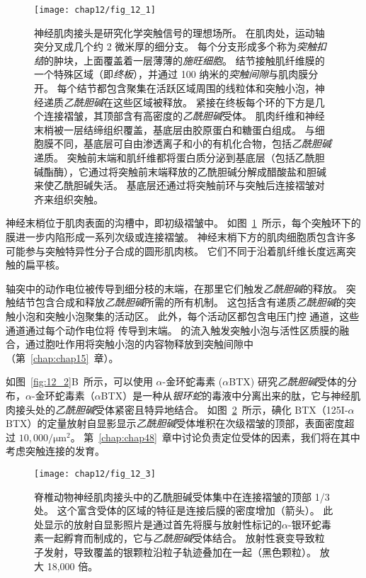 \begin{figure}[htbp]
	\centering
	\texttt{[image: chap12/fig\_12\_1]}
	\caption{神经肌肉接头是研究化学突触信号的理想场所。
		在肌肉处，运动轴突分叉成几个约 2 微米厚的细分支。
		每个分支形成多个称为\textit{突触扣结}的肿块，上面覆盖着一层薄薄的\textit{施旺细胞}。
		结节接触肌纤维膜的一个特殊区域（即\textit{终板}），并通过 100 纳米的\textit{突触间隙}与肌肉膜分开。
		每个结节都包含聚集在活跃区域周围的线粒体和突触小泡，神经递质\textit{乙酰胆碱}在这些区域被释放。
		紧接在终板每个环的下方是几个连接褶皱，其顶部含有高密度的\textit{乙酰胆碱}受体。
		肌肉纤维和神经末梢被一层结缔组织覆盖，基底层由胶原蛋白和糖蛋白组成。
		与细胞膜不同，基底层可自由渗透离子和小的有机化合物，包括\textit{乙酰胆碱}递质。
		突触前末端和肌纤维都将蛋白质分泌到基底层（包括乙酰胆碱酯酶），它通过将突触前末端释放的乙酰胆碱分解成醋酸盐和胆碱来使乙酰胆碱失活。
		基底层还通过将突触前环与突触后连接褶皱对齐来组织突触\cite{mcmahan1971visual}。}
	\label{fig:12_1}
\end{figure}


神经末梢位于肌肉表面的沟槽中，即初级褶皱中。
如图~\ref{fig:12_1}~所示，每个突触环下的膜进一步内陷形成一系列次级或连接褶皱。
神经末梢下方的肌肉细胞质包含许多可能参与突触特异性分子合成的圆形肌肉核。
它们不同于沿着肌纤维长度远离突触的扁平核。


轴突中的动作电位被传导到细分枝的末端，在那里它们触发\textit{乙酰胆碱}的释放。
突触结节包含合成和释放\textit{乙酰胆碱}所需的所有机制。
这包括含有递质\textit{乙酰胆碱}的突触小泡和突触小泡聚集的活动区。
此外，每个活动区都包含电压门控  通道，这些通道通过每个动作电位将  传导到末端。
 的流入触发突触小泡与活性区质膜的融合，通过胞吐作用将突触小泡的内容物释放到突触间隙中（第~\ref{chap:chap15}~章）。


如图~\ref{fig:12_2}B~所示，可以使用 $\alpha$-金环蛇毒素 ($\alpha$BTX) 研究\textit{乙酰胆碱}受体的分布，$\alpha$-金环蛇毒素（$\alpha$BTX）是一种从\textit{银环蛇}的毒液中分离出来的肽，它与神经肌肉接头处的\textit{乙酰胆碱}受体紧密且特异地结合。
如图~\ref{fig:12_3}~所示，碘化 BTX（125I-$\alpha$BTX）的定量放射自显影显示\textit{乙酰胆碱}受体堆积在次级褶皱的顶部，表面密度超过 $10,000/\mathrm{\mu m}^2$。
第~\ref{chap:chap48}~章中讨论负责定位受体的因素，我们将在其中考虑突触连接的发育。


\begin{figure}[htbp]
	\centering
	\texttt{[image: chap12/fig\_12\_3]}
	\caption{脊椎动物神经肌肉接头中的乙酰胆碱受体集中在连接褶皱的顶部 1/3 处。
		这个富含受体的区域的特征是连接后膜的密度增加（箭头）。
		此处显示的放射自显影照片是通过首先将膜与放射性标记的$\alpha$-银环蛇毒素一起孵育而制成的，它与\textit{乙酰胆碱}受体结合。
		放射性衰变导致粒子发射，导致覆盖的银颗粒沿粒子轨迹叠加在一起（黑色颗粒）。
		放大 18,000 倍。}
	\label{fig:12_3}
\end{figure}



